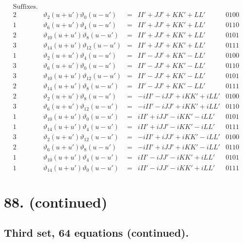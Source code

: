 \documentclass[11pt,a4paper]{article}
\newcommand{\uth}[1]{\vartheta_{#1}}
\begin{document}
\[
\begin{array}{ccccc}
\text{Suffixes.} & & & & \\
\hline
2 & \uth{2}(u+u')\uth{0}(u-u') &=& II' + JJ' + KK' + LL' & 0100 \\
1 & \uth{6}(u+u')\uth{4}(u-u') &=& II' + JJ' + KK' + LL' & 0110 \\
2 & \uth{10}(u+u')\uth{8}(u-u') &=& II' + JJ' + KK' + LL' & 0101 \\
3 & \uth{14}(u+u')\uth{12}(u-u') &=& II' + JJ' + KK' + LL' & 0111 \\
\hline
1 & \uth{2}(u+u')\uth{4}(u-u') &=& II' - JJ' + KK' - LL' & 0100 \\
3 & \uth{6}(u+u')\uth{0}(u-u') &=& II' - JJ' + KK' - LL' & 0110 \\
3 & \uth{10}(u+u')\uth{12}(u-u') &=& II' - JJ' + KK' - LL' & 0101 \\
2 & \uth{14}(u+u')\uth{8}(u-u') &=& II' - JJ' + KK' - LL' & 0111 \\
\hline
2 & \uth{2}(u+u')\uth{8}(u-u') &=& -iII' - iJJ' + iKK' + iLL' & 0100 \\
3 & \uth{6}(u+u')\uth{12}(u-u') &=& -iII' - iJJ' + iKK' + iLL' & 0110 \\
1 & \uth{10}(u+u')\uth{0}(u-u') &=& iII' + iJJ' - iKK' - iLL' & 0101 \\
1 & \uth{14}(u+u')\uth{4}(u-u') &=& iII' + iJJ' - iKK' - iLL' & 0111 \\
\hline
3 & \uth{2}(u+u')\uth{12}(u-u') &=& -iII' + iJJ' + iKK' - iLL' & 0100 \\
2 & \uth{6}(u+u')\uth{8}(u-u') &=& -iII' + iJJ' + iKK' - iLL' & 0110 \\
1 & \uth{10}(u+u')\uth{4}(u-u') &=& iII' - iJJ' - iKK' + iLL' & 0101 \\
1 & \uth{14}(u+u')\uth{0}(u-u') &=& iII' - iJJ' - iKK' + iLL' & 0111
\end{array}
\]


\newpage
\section*{88. (continued)}
\label{sec:88cont}

\subsection*{Third set, 64 equations (continued).}
\end{document}
